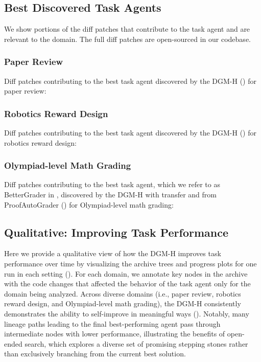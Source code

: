 \documentclass[]{fairmeta}
\begin{document}
\subsection{Best Discovered Task Agents}
\label{app:best-agents}

We show portions of the diff patches that contribute to the task agent and are relevant to the domain. The full diff patches are open-sourced in our codebase.

\subsubsection{Paper Review}
\label{app:best-agents-paperreview}
Diff patches contributing to the best task agent discovered by the DGM-H () for paper review:


\subsubsection{Robotics Reward Design}
\label{app:best-agents-genesis}
Diff patches contributing to the best task agent discovered by the DGM-H () for robotics reward design:


\subsubsection{Olympiad-level Math Grading}
\label{app:best-agents-imograding}
Diff patches contributing to the best task agent, which we refer to as BetterGrader in , discovered by the DGM-H with transfer and from ProofAutoGrader () for Olympiad-level math grading:


\subsection{Qualitative: Improving Task Performance}
\label{app:qual-task}

Here we provide a qualitative view of how the DGM-H improves task performance over time by visualizing the archive trees and progress plots for one run in each setting (). For each domain, we annotate key nodes in the archive with the code changes that affected the behavior of the task agent only for the domain being analyzed. Across diverse domains (i.e., paper review, robotics reward design, and Olympiad-level math grading), the DGM-H consistently demonstrates the ability to self-improve in meaningful ways (). Notably, many lineage paths leading to the final best-performing agent pass through intermediate nodes with lower performance, illustrating the benefits of open-ended search, which explores a diverse set of promising stepping stones rather than exclusively branching from the current best solution.
\end{document}
